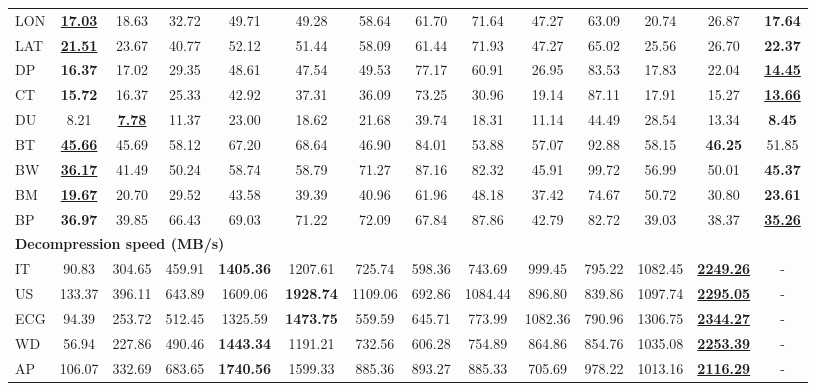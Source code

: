 \begin{sidewaystable}
\begin{tabular}{@{}l *{13}{c}@{}}
LON & \underline{\textbf{17.03}} & 18.63 & 32.72 & 49.71 & 49.28 & 58.64 & 61.70 & 71.64 & 47.27 & 63.09 & 20.74 & 26.87 & \textbf{17.64} \\
LAT & \underline{\textbf{21.51}} & 23.67 & 40.77 & 52.12 & 51.44 & 58.09 & 61.44 & 71.93 & 47.27 & 65.02 & 25.56 & 26.70 & \textbf{22.37} \\
DP & \textbf{16.37} & 17.02 & 29.35 & 48.61 & 47.54 & 49.53 & 77.17 & 60.91 & 26.95 & 83.53 & 17.83 & 22.04 & \underline{\textbf{14.45}} \\
CT & \textbf{15.72} & 16.37 & 25.33 & 42.92 & 37.31 & 36.09 & 73.25 & 30.96 & 19.14 & 87.11 & 17.91 & 15.27 & \underline{\textbf{13.66}} \\
DU & 8.21 & \underline{\textbf{7.78}} & 11.37 & 23.00 & 18.62 & 21.68 & 39.74 & 18.31 & 11.14 & 44.49 & 28.54 & 13.34 & \textbf{8.45} \\
BT & \underline{\textbf{45.66}} & 45.69 & 58.12 & 67.20 & 68.64 & 46.90 & 84.01 & 53.88 & 57.07 & 92.88 & 58.15 & \textbf{46.25} & 51.85 \\
BW & \underline{\textbf{36.17}} & 41.49 & 50.24 & 58.74 & 58.79 & 71.27 & 87.16 & 82.32 & 45.91 & 99.72 & 56.99 & 50.01 & \textbf{45.37} \\
BM & \underline{\textbf{19.67}} & 20.70 & 29.52 & 43.58 & 39.39 & 40.96 & 61.96 & 48.18 & 37.42 & 74.67 & 50.72 & 30.80 & \textbf{23.61} \\
BP & \textbf{36.97} & 39.85 & 66.43 & 69.03 & 71.22 & 72.09 & 67.84 & 87.86 & 42.79 & 82.72 & 39.03 & 38.37 & \underline{\textbf{35.26}} \\
\midrule
\multicolumn{14}{l}{\textbf{Decompression speed (MB/s)}} \\
\midrule
IT & 90.83 & 304.65 & 459.91 & \textbf{1405.36} & 1207.61 & 725.74 & 598.36 & 743.69 & 999.45 & 795.22 & 1082.45 & \underline{\textbf{2249.26}} & - \\
US & 133.37 & 396.11 & 643.89 & 1609.06 & \textbf{1928.74} & 1109.06 & 692.86 & 1084.44 & 896.80 & 839.86 & 1097.74 & \underline{\textbf{2295.05}} & - \\
ECG & 94.39 & 253.72 & 512.45 & 1325.59 & \textbf{1473.75} & 559.59 & 645.71 & 773.99 & 1082.36 & 790.96 & 1306.75 & \underline{\textbf{2344.27}} & - \\
WD & 56.94 & 227.86 & 490.46 & \textbf{1443.34} & 1191.21 & 732.56 & 606.28 & 754.89 & 864.86 & 854.76 & 1035.08 & \underline{\textbf{2253.39}} & - \\
AP & 106.07 & 332.69 & 683.65 & \textbf{1740.56} & 1599.33 & 885.36 & 893.27 & 885.33 & 705.69 & 978.22 & 1013.16 & \underline{\textbf{2116.29}} & - \\

\end{tabular}
\end{sidewaystable}
